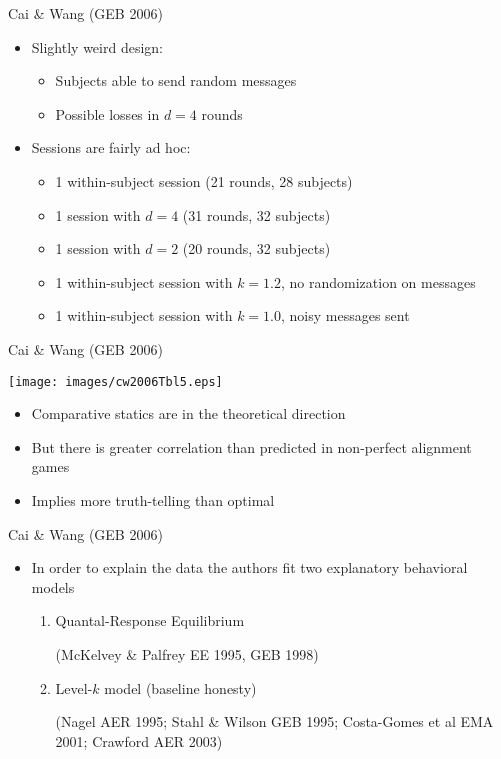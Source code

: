 \documentclass{beamer}
\begin{document}
\begin{frame}{Cai \& Wang (GEB 2006)}
	\begin{itemize}
		\item Slightly weird design:
		\begin{itemize}
			\item Subjects able to send random messages
			\item Possible losses in $d=4$ rounds
		\end{itemize}
		\item Sessions are fairly ad hoc:
		\begin{itemize}
			\item 1 within-subject session (21 rounds, 28 subjects)
			\item 1 session with $d=4$ (31 rounds, 32 subjects)
			\item 1 session with $d=2$ (20 rounds, 32 subjects)
			\item 1 within-subject session with $k=1.2$, no randomization on messages
			\item 1 within-subject session with $k=1.0$, noisy messages sent
		\end{itemize}
	\end{itemize}
\end{frame}

\begin{frame}{Cai \& Wang (GEB 2006)}
\begin{center}\texttt{[image: images/cw2006Tbl5.eps]}\end{center}
	\begin{itemize}
		\item Comparative statics are in the theoretical direction
		\item But there is greater correlation than predicted in non-perfect alignment games
		\item Implies more truth-telling than optimal
	\end{itemize}
\end{frame}

\begin{frame}{Cai \& Wang (GEB 2006)}
	\begin{itemize}
		\item In order to explain the data the authors fit two explanatory behavioral models
		\begin{enumerate}
			\item Quantal-Response Equilibrium

			(McKelvey \& Palfrey EE 1995, GEB 1998)
			\item Level-$k$ model (baseline honesty)

			(Nagel AER 1995; Stahl \& Wilson GEB 1995; Costa-Gomes et al EMA 2001; Crawford AER 2003)
		\end{enumerate}
	\end{itemize}
\end{frame}
\end{document}
